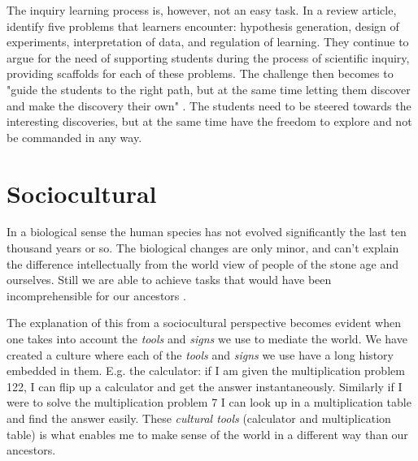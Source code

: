 The inquiry learning process is, however, not an easy task. In a review article, \citet{de1998scientific} identify five problems that learners encounter: hypothesis generation, design of experiments, interpretation of data, and regulation of learning. They continue to argue for the need of supporting students during the process of scientific inquiry, providing scaffolds for each of these problems. The challenge then becomes to "guide the students to the right path, but at the same time letting them discover and make the discovery their own" \citep{kluge2010simulation}. The students need to be steered towards the interesting discoveries, but at the same time have the freedom to explore and not be commanded in any way. 
 

\section{Sociocultural}

In a biological sense the human species has not evolved significantly the last ten thousand years or so. The biological changes are only minor, and can’t explain the difference intellectually from the world view of people of the stone age and ourselves. Still we are able to achieve tasks that would have been incomprehensible for our ancestors \citep{saljo2001laering}.

The explanation of this from a sociocultural perspective becomes evident when one takes into account the \emph{tools} and \emph{signs} we use to mediate the world. We have created a culture where each of the \emph{tools} and \emph{signs} we use have a long history embedded in them. E.g. the calculator: if I am given the multiplication problem 122, I can flip up a calculator and get the answer instantaneously. Similarly if I were to solve the multiplication problem 7 I can look up in a multiplication table and find the answer easily. These \emph{cultural tools} (calculator and multiplication table) is what enables me to make sense of the world in a different way than our ancestors. 

